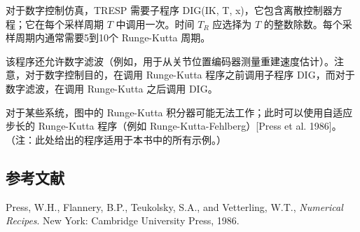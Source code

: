 \documentclass[UTF8]{ctexart}
\begin{document}
对于数字控制仿真，TRESP 需要子程序 DIG(IK, T, x)，它包含离散控制器方程；它在每个采样周期 $T$ 中调用一次。时间 $T_R$ 应选择为 $T$ 的整数除数。每个采样周期内通常需要5到10个 Runge-Kutta 周期。

该程序还允许数字滤波（例如，用于从关节位置编码器测量重建速度估计）。注意，对于数字控制目的，在调用 Runge-Kutta 程序之前调用子程序 DIG，而对于数字滤波，在调用 Runge-Kutta 之后调用 DIG。

对于某些系统，图中的 Runge-Kutta 积分器可能无法工作；此时可以使用自适应步长的 Runge-Kutta 程序（例如 Runge-Kutta-Fehlberg）[Press et al. 1986]。（注：此处给出的程序适用于本书中的所有示例。）

\vspace{1em}

\subsection*{参考文献}

\noindent [Press et al. 1986] Press, W.H., Flannery, B.P., Teukolsky, S.A., and Vetterling, W.T., \textit{Numerical Recipes}. New York: Cambridge University Press, 1986.
\end{document}
